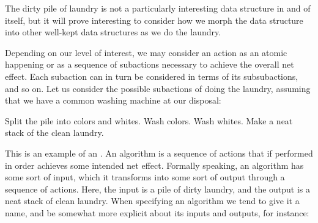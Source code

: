 

The dirty pile of laundry is not a particularly interesting data structure in
and of itself, but it will prove interesting to consider how we morph the data
structure into other well-kept data structures as we do the laundry.

Depending on our level of interest, we may consider an action as an atomic
happening or as a sequence of subactions necessary to achieve the overall net
effect. Each subaction can in turn be considered in terms of its subsubactions,
and so on. Let us consider the possible subactions of doing the laundry,
assuming that we have a common washing machine at our disposal:

\begin{codebox}
\li Split the pile into colors and whites.
\li Wash colors.
\li Wash whites.
\li Make a neat stack of the clean laundry.
\end{codebox}

This is an example of an . An algorithm is a sequence of actions
that if performed in order achieves some intended net effect. Formally
speaking, an algorithm has some sort of input, which it transforms into some
sort of output through a sequence of actions. Here, the input is a pile of
dirty laundry, and the output is a neat stack of clean laundry. When specifying
an algorithm we tend to give it a name, and be somewhat more explicit about its
inputs and outputs, for instance:

